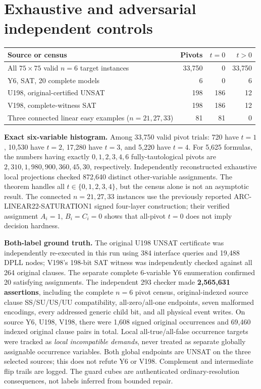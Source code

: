 \documentclass[10pt]{article}
\begin{document}
\section{Exhaustive and adversarial independent controls}
\begin{center}\begin{tabular}{lrrr}\toprule
Source or census & Pivots & $t=0$ & $t>0$\\\midrule
All $75\times75$ valid $n=6$ target instances &33,750&0&33,750\\
Y6, SAT, 20 complete models &6&0&6\\
U198, original-certified UNSAT &198&186&12\\
V198, complete-witness SAT &198&186&12\\
Three connected linear easy examples ($n=21,27,33$)&81&81&0\\\bottomrule\end{tabular}\end{center}
\noindent\textbf{Exact six-variable histogram.} Among 33,750 valid pivot trials: 720 have $t=1$, 10,530 have $t=2$, 17,280 have $t=3$, and 5,220 have $t=4$. For 5,625 formulas, the numbers having exactly $0,1,2,3,4,6$ fully-tautological pivots are $2,310,1,980,900,360,45,30$, respectively. Independently reconstructed exhaustive local projections checked 872,640 distinct other-variable assignments. The theorem handles all $t\in\{0,1,2,3,4\}$, but the census alone is not an asymptotic result. The connected $n=21,27,33$ instances use the previously reported ARC-LINEAR22-SATURATION1 signed four-layer construction; their verified assignment $A_i=1$, $B_i=C_i=0$ shows that all-pivot $t=0$ does not imply decision hardness.

\noindent\textbf{Both-label ground truth.} The original U198 UNSAT certificate was independently re-executed in this run using 384 interface queries and 19,488 DPLL nodes; V198's 198-bit SAT witness was independently checked against all 264 original clauses. The separate complete 6-variable Y6 enumeration confirmed 20 satisfying assignments. The independent 293 checker made \textbf{2,565,631 assertions}, including the complete $n=6$ pivot census, original-indexed source clause SS/SU/US/UU compatibility, all-zero/all-one endpoints, seven malformed encodings, every addressed generic child bit, and all physical event writes. On source Y6, U198, V198, there were 1,608 signed original occurrences and 69,460 indexed original clause pairs in total. Local all-true/all-false occurrence targets were tracked as \emph{local incompatible demands}, never treated as separate globally assignable occurrence variables. Both global endpoints are UNSAT on the three selected sources; this does not refute Y6 or V198. Complement and intermediate flip trails are logged. The guard cubes are authenticated ordinary-resolution consequences, not labels inferred from bounded repair.
\end{document}
